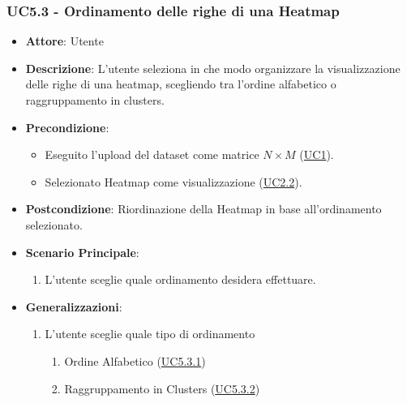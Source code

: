     \subsubsection{UC5.3 - Ordinamento delle righe di una Heatmap}
    \label{uc5.3}
    \begin{itemize}
    \item \textbf{Attore}: Utente
    \item \textbf{Descrizione}: L'utente seleziona in che modo organizzare la visualizzazione delle righe di una heatmap, scegliendo tra l'ordine alfabetico o raggruppamento in clusters.
    \item \textbf{Precondizione}: 
    \begin{itemize}
        \item Eseguito l'upload del dataset come matrice $N\times M$ (\hyperref[uc1]{UC1}).
        \item Selezionato Heatmap come visualizzazione (\hyperref[uc2.2]{UC2.2}).
    \end{itemize}  
    \item \textbf{Postcondizione}: Riordinazione della Heatmap in base all'ordinamento selezionato.
    \item \textbf{Scenario Principale}: 
    \begin{enumerate}
        \item L'utente sceglie quale ordinamento desidera effettuare.
    \end{enumerate}  
    \item \textbf{Generalizzazioni}: 
     \begin{enumerate}
            \item L'utente sceglie quale tipo di ordinamento
                \begin{enumerate}
                    \item Ordine Alfabetico (\hyperref[uc5.3.1]{UC5.3.1})
                    \item Raggruppamento in Clusters (\hyperref[uc5.3.2]{UC5.3.2})
                    \end{enumerate}
        \end{enumerate} 
    \end{itemize}
    
